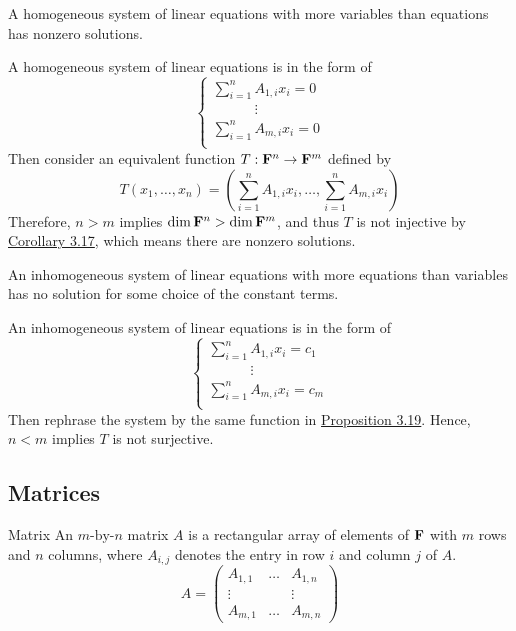 \documentclass[12pt,a4paper]{article}
\begin{document}
    \begin{prop}\label{3.19}
        A homogeneous system of linear equations with more variables than equations has nonzero solutions.
    \end{prop}
    \begin{remark}
        A homogeneous system of linear equations is in the form of
        $$
        \begin{cases}
            \displaystyle\sum_{i=1}^nA_{1,i}x_i=0\\
            \displaystyle\qquad\quad\vdots\\
            \displaystyle\sum_{i=1}^nA_{m,i}x_i=0\\
        \end{cases}
        $$
        Then consider an equivalent function $T: \mathbf{F}^n\to\mathbf{F}^m$ defined by
        $$
        T(x_1,\dots,x_n)=(\sum_{i=1}^nA_{1,i}x_i,\dots,\sum_{i=1}^nA_{m,i}x_i)
        $$
        Therefore, $n>m$ implies $\dim \mathbf{F}^n>\dim \mathbf{F}^m$, and thus $T$ is not injective by \hyperref[3.17]{Corollary 3.17}, which means there are nonzero solutions.
    \end{remark}
    \begin{prop}
        An inhomogeneous system of linear equations with more equations than variables has no solution for some choice of the constant terms.
    \end{prop}
    \begin{remark}
        An inhomogeneous system of linear equations is in the form of
        $$
        \begin{cases}
            \displaystyle\sum_{i=1}^nA_{1,i}x_i=c_1\\
            \displaystyle\qquad\quad\vdots\\
            \displaystyle\sum_{i=1}^nA_{m,i}x_i=c_m\\
        \end{cases}
        $$
        Then rephrase the system by the same function in \hyperref[3.19]{Proposition 3.19}. Hence, $n<m$ implies $T$ is not surjective.
    \end{remark}
    \hfill

    \subsection{Matrices}
    \begin{defi}{Matrix}
        An $m\text{-by-}n$ matrix $A$ is a rectangular array of elements of $\mathbf{F}$ with $m$ rows and $n$ columns, where $A_{i,j}$ denotes the entry in row $i$ and column $j$ of $A$.
        $$A=\begin{pmatrix}
            A_{1,1}& \dots &A_{1,n}\\
            \vdots & & \vdots\\
            A_{m,1}& \dots& A_{m,n}
        \end{pmatrix}$$
    \end{defi}
    \hfill
\end{document}
